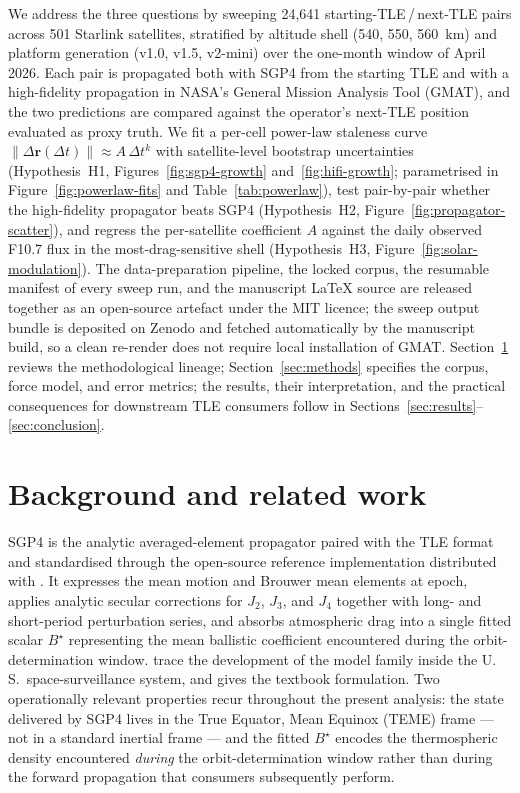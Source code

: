 \documentclass[10pt, letterpaper]{article}
\begin{document}
We address the three questions by sweeping 24{,}641
starting-TLE\,/\,next-TLE pairs across 501 Starlink satellites,
stratified by altitude shell (540, 550, 560~km) and platform generation
(v1.0, v1.5, v2-mini) over the one-month window of April 2026. Each
pair is propagated both with SGP4 from the starting TLE and with a
high-fidelity propagation in NASA's General Mission Analysis Tool
(GMAT), and the two predictions are compared against the operator's
next-TLE position evaluated as proxy truth. We fit a per-cell power-law
staleness curve $\lVert\Delta\mathbf{r}(\Delta t)\rVert \approx
A\,\Delta t^{k}$ with satellite-level bootstrap uncertainties
(Hypothesis~H1, Figures~\ref{fig:sgp4-growth}
and~\ref{fig:hifi-growth}; parametrised in
Figure~\ref{fig:powerlaw-fits} and Table~\ref{tab:powerlaw}), test
pair-by-pair whether the high-fidelity propagator beats SGP4
(Hypothesis~H2, Figure~\ref{fig:propagator-scatter}), and regress the
per-satellite coefficient $A$ against the daily observed F10.7 flux in
the most-drag-sensitive shell (Hypothesis~H3,
Figure~\ref{fig:solar-modulation}). The data-preparation pipeline,
the locked corpus, the resumable manifest of every sweep run, and the
manuscript \LaTeX{} source are released together as an open-source
artefact under the MIT licence; the sweep output bundle is deposited
on Zenodo and fetched automatically by the manuscript build, so a
clean re-render does not require local installation of GMAT.
Section~\ref{sec:background} reviews the methodological lineage;
Section~\ref{sec:methods} specifies the corpus, force model, and
error metrics; the results, their interpretation, and the practical
consequences for downstream TLE consumers follow in
Sections~\ref{sec:results}--\ref{sec:conclusion}.

\section{Background and related work}
\label{sec:background}

SGP4 is the analytic averaged-element propagator paired with the TLE
format and standardised through the open-source reference
implementation distributed with \citet{vallado2006}. It expresses the
mean motion and Brouwer mean elements at epoch, applies analytic
secular corrections for $J_2$, $J_3$, and $J_4$ together with
long- and short-period perturbation series, and absorbs atmospheric
drag into a single fitted scalar $B^{\!\star}$ representing the mean
ballistic coefficient encountered during the orbit-determination
window. \citet{hoots2004} trace the development of the model family
inside the U.\,S.\ space-surveillance system, and
\citet[\S\,11.6]{vallado2013} gives the textbook formulation. Two
operationally relevant properties recur throughout the present
analysis: the state delivered by SGP4 lives in the True Equator,
Mean Equinox (TEME) frame --- not in a standard inertial frame ---
and the fitted $B^{\!\star}$ encodes the thermospheric density
encountered \emph{during} the orbit-determination window rather than
during the forward propagation that consumers subsequently perform.
\end{document}
